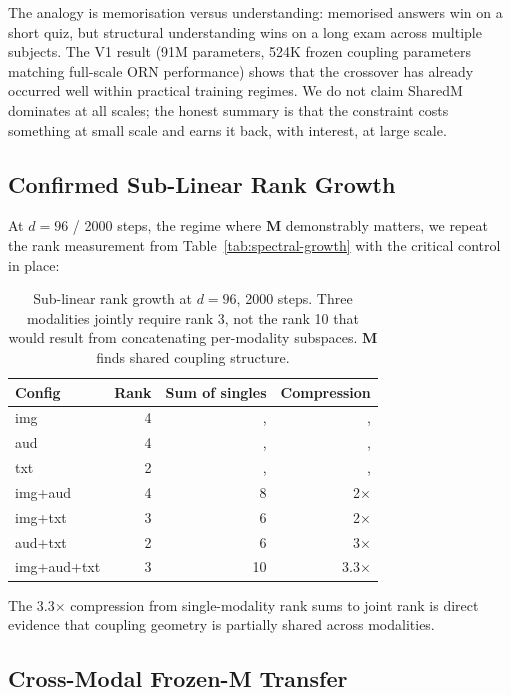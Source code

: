 \documentclass[11pt, a4paper]{article}
\newcommand{\M}{\mathbf{M}}
\theoremstyle{plain}
\theoremstyle{remark}
\begin{document}
The analogy is memorisation versus understanding: memorised answers win on a short quiz, but structural understanding wins on a long exam across multiple subjects.
The V1 result (91M parameters, 524K frozen coupling parameters matching full-scale ORN performance) shows that the crossover has already occurred well within practical training regimes.
We do not claim SharedM dominates at all scales; the honest summary is that the constraint costs something at small scale and earns it back, with interest, at large scale.

\subsection{Confirmed Sub-Linear Rank Growth}\label{sec:confirmed-rank}

At $d{=}96$ / 2000 steps, the regime where $\M$ demonstrably matters, we repeat the rank measurement from Table~\ref{tab:spectral-growth} with the critical control in place:

\begin{table}[h]
\centering
\small
\begin{tabular}{@{}lrrr@{}}
\toprule
\textbf{Config} & \textbf{Rank} & \textbf{Sum of singles} & \textbf{Compression} \\
\midrule
img & 4 & ,  & ,  \\
aud & 4 & ,  & ,  \\
txt & 2 & ,  & ,  \\
\midrule
img+aud & 4 & 8 & 2$\times$ \\
img+txt & 3 & 6 & 2$\times$ \\
aud+txt & 2 & 6 & 3$\times$ \\
img+aud+txt & 3 & 10 & 3.3$\times$ \\
\bottomrule
\end{tabular}
\caption{Sub-linear rank growth at $d{=}96$, 2000 steps.  Three modalities jointly require rank 3, not the rank 10 that would result from concatenating per-modality subspaces.  $\M$ finds shared coupling structure.}
\label{tab:confirmed-rank}
\end{table}

The 3.3$\times$ compression from single-modality rank sums to joint rank is direct evidence that coupling geometry is partially shared across modalities.

\subsection{Cross-Modal Frozen-M Transfer}\label{sec:frozen-transfer}
\end{document}
